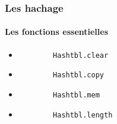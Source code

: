 \begin{frame}[fragile]
\frametitle{Les hachage}
\framesubtitle{Les fonctions essentielles}
	\begin{itemize}
	
	\item
		\begin{lstlisting}
		Hashtbl.clear
		\end{lstlisting}

	\item
		\begin{lstlisting}
		Hashtbl.copy
		\end{lstlisting}	

	\item
		\begin{lstlisting}
		Hashtbl.mem
		\end{lstlisting}	

	\item
		\begin{lstlisting}
		Hashtbl.length
		\end{lstlisting}

	\end{itemize}

\end{frame}


